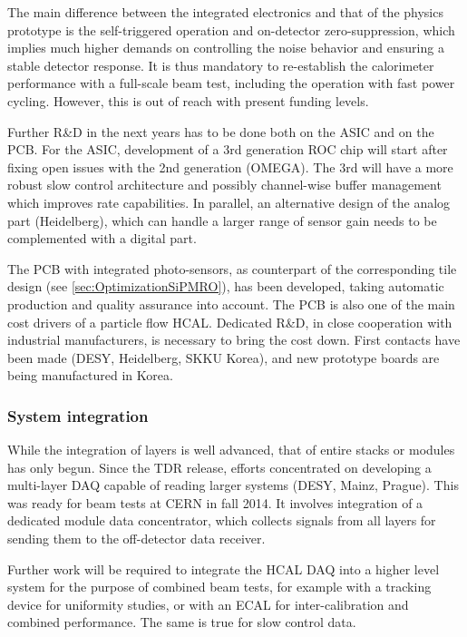 The main difference between the integrated electronics and that of the physics prototype is the self-triggered operation and on-detector zero-suppression, which implies much higher demands on controlling the noise behavior and ensuring a stable detector response. It is thus mandatory to re-establish the calorimeter performance with a full-scale beam test, including the operation with fast power cycling. However, this is out of reach with present funding levels.

Further R\&D in the next years has to be done both on the ASIC and on the PCB. For the ASIC, development of a 3rd generation ROC chip will start after fixing open issues with the 2nd generation (OMEGA). The 3rd will have a more robust slow control architecture and possibly channel-wise buffer management which improves rate capabilities. In parallel, an alternative design of the analog part (Heidelberg), which can handle a larger range of sensor gain needs to be complemented with a digital part.

The PCB with integrated photo-sensors, as counterpart of the corresponding tile design (see \ref{sec:OptimizationSiPMRO}), has been developed, taking automatic production and quality assurance into account. The PCB is also one of the main cost drivers of a particle flow HCAL. Dedicated R\&D, in close cooperation with industrial manufacturers, is necessary to bring the cost down. First contacts have been made (DESY, Heidelberg, SKKU Korea), and new prototype boards are being manufactured in Korea.

\subsubsection{System integration}

While the integration of layers is well advanced, that of entire stacks or modules has only begun. Since the TDR release, efforts concentrated on developing a multi-layer DAQ capable of reading larger systems (DESY, Mainz, Prague). This was ready for beam tests at CERN  in fall 2014. It involves integration of a dedicated module data concentrator, which collects signals from all layers for sending them to the off-detector data receiver.

Further work will be required to integrate the HCAL DAQ into a higher level system for the purpose of combined beam tests, for example with a tracking device for uniformity studies, or with an ECAL for inter-calibration and combined performance. The same is true for slow control data.

